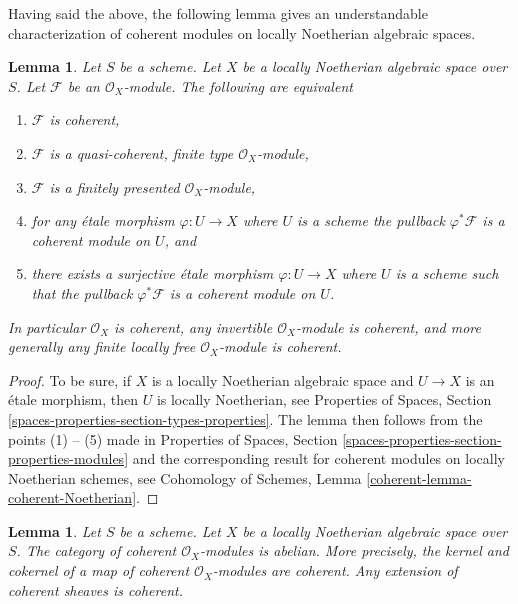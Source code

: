 \documentclass{stacks-project}
\theoremstyle{plain}
\newtheorem{lemma}[subsection]{Lemma}
\theoremstyle{definition}
\theoremstyle{remark}
\numberwithin{equation}{subsection}
\begin{document}
\medskip\noindent
Having said the above, the following lemma gives an understandable
characterization of coherent modules on locally Noetherian algebraic
spaces.

\begin{lemma}
\label{lemma-coherent-Noetherian}
Let $S$ be a scheme.
Let $X$ be a locally Noetherian algebraic space over $S$.
Let $\mathcal{F}$ be an $\mathcal{O}_X$-module.
The following are equivalent
\begin{enumerate}
\item $\mathcal{F}$ is coherent,
\item $\mathcal{F}$ is a quasi-coherent, finite type $\mathcal{O}_X$-module,
\item $\mathcal{F}$ is a finitely presented $\mathcal{O}_X$-module,
\item for any \'etale morphism $\varphi : U \to X$ where $U$ is a scheme
the pullback $\varphi^*\mathcal{F}$ is a coherent module on $U$, and
\item there exists a surjective \'etale morphism $\varphi : U \to X$
where $U$ is a scheme such that the pullback $\varphi^*\mathcal{F}$ is
a coherent module on $U$.
\end{enumerate}
In particular $\mathcal{O}_X$ is coherent, any invertible
$\mathcal{O}_X$-module is coherent, and more generally any
finite locally free $\mathcal{O}_X$-module is coherent.
\end{lemma}

\begin{proof}
To be sure, if $X$ is a locally Noetherian algebraic space and
$U \to X$ is an \'etale morphism, then $U$ is locally Noetherian, see
Properties of Spaces, Section \ref{spaces-properties-section-types-properties}.
The lemma then follows from the points (1) -- (5) made in
Properties of Spaces, Section \ref{spaces-properties-section-properties-modules}
and the corresponding result for coherent modules on locally
Noetherian schemes, see
Cohomology of Schemes, Lemma \ref{coherent-lemma-coherent-Noetherian}.
\end{proof}

\begin{lemma}
\label{lemma-coherent-abelian-Noetherian}
Let $S$ be a scheme. Let $X$ be a locally Noetherian algebraic space over $S$.
The category of coherent $\mathcal{O}_X$-modules is abelian. More precisely,
the kernel and cokernel of a map of coherent $\mathcal{O}_X$-modules are
coherent. Any extension of coherent sheaves is coherent.
\end{lemma}
\end{document}
